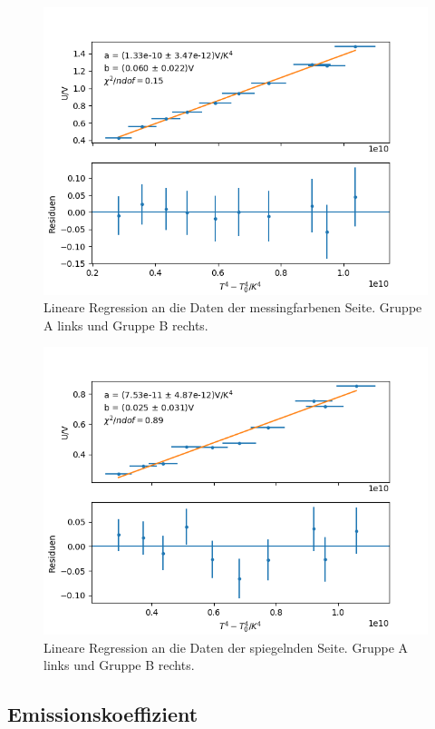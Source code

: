 \documentclass[12pt,a4paper]{article}
\begin{document}
\begin{figure}
\includegraphics[scale=0.5]{Bilder/Messing_A}
\caption{Lineare Regression an die Daten der messingfarbenen Seite. Gruppe A links und Gruppe B rechts.}
\label{fig:RegMessing}
\end{figure}

\begin{figure}
\includegraphics[scale=0.5]{Bilder/Spiegel_A}
\caption{Lineare Regression an die Daten der spiegelnden Seite. Gruppe A links und Gruppe B rechts.}
\label{fig:RegSpiegel}
\end{figure}


\subsection{Emissionskoeffizient}
\end{document}
